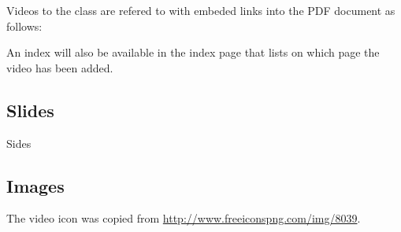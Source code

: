 Videos to the class are refered to with embeded links into the PDF
document as follows: 


An index will also be available in the index page
that lists on which page the video has been added.

\subsection{Slides}

Sides

\subsection{Images}

The video icon was copied from \url{http://www.freeiconspng.com/img/8039}.
